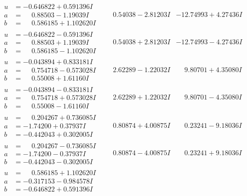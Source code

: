 \documentclass[1p]{elsarticle_modified}
\theoremstyle{definition}
\begin{document}
$$\begin{array}{c|c|c}
\begin{aligned}
u &= -0.646822 + 0.591396 I \\
a &= \phantom{-}0.88503 - 1.19039 I \\
b &= \phantom{-}0.586185 + 1.102620 I\end{aligned}
 & \phantom{-}0.54038 - 2.81203 I & -12.74993 + 4.27436 I \\ \hline\begin{aligned}
u &= -0.646822 - 0.591396 I \\
a &= \phantom{-}0.88503 + 1.19039 I \\
b &= \phantom{-}0.586185 - 1.102620 I\end{aligned}
 & \phantom{-}0.54038 + 2.81203 I & -12.74993 - 4.27436 I \\ \hline\begin{aligned}
u &= -0.043894 + 0.833181 I \\
a &= \phantom{-}0.754718 - 0.573028 I \\
b &= \phantom{-}0.55008 + 1.61160 I\end{aligned}
 & \phantom{-}2.62289 - 1.22032 I & \phantom{-}9.80701 + 4.35080 I \\ \hline\begin{aligned}
u &= -0.043894 - 0.833181 I \\
a &= \phantom{-}0.754718 + 0.573028 I \\
b &= \phantom{-}0.55008 - 1.61160 I\end{aligned}
 & \phantom{-}2.62289 + 1.22032 I & \phantom{-}9.80701 - 4.35080 I \\ \hline\begin{aligned}
u &= \phantom{-}0.204267 + 0.736085 I \\
a &= -1.74200 + 0.37937 I \\
b &= -0.442043 + 0.302005 I\end{aligned}
 & \phantom{-}0.80874 + 4.00875 I & \phantom{-}0.23241 - 9.18036 I \\ \hline\begin{aligned}
u &= \phantom{-}0.204267 - 0.736085 I \\
a &= -1.74200 - 0.37937 I \\
b &= -0.442043 - 0.302005 I\end{aligned}
 & \phantom{-}0.80874 - 4.00875 I & \phantom{-}0.23241 + 9.18036 I \\ \hline\begin{aligned}
u &= \phantom{-}0.586185 + 1.102620 I \\
a &= -0.317153 - 0.984578 I \\
b &= -0.646822 + 0.591396 I\end{aligned}

\end{array}$$
\end{document}

